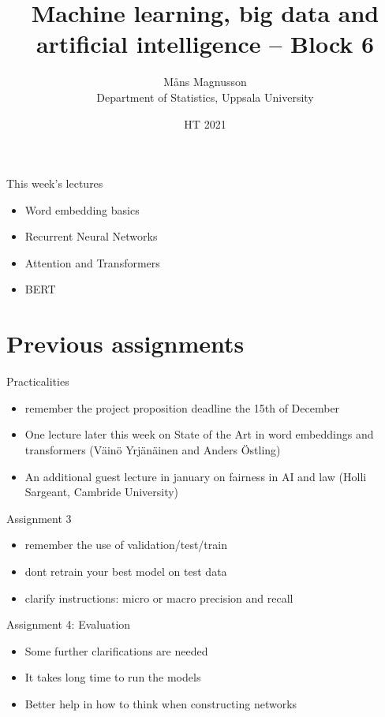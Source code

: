 \documentclass[10pt]{beamer}
\title[]{{\color{black}Machine learning, big data and artificial intelligence -- Block 6}}
\author[]{M{\aa}ns Magnusson\\Department of Statistics, Uppsala University}
\date{HT 2021}
\begin{document}
\frame{\titlepage
}



\begin{frame}{This week's lectures}
\begin{itemize}
\item Word embedding basics
\item Recurrent Neural Networks
\item Attention and Transformers
\item BERT
\end{itemize}
\end{frame}




\section{Previous assignments}

\begin{frame}{Practicalities}

\begin{itemize}
\item remember the project proposition deadline the 15th of December
\item One lecture later this week on State of the Art in word embeddings and transformers (Väinö Yrjänäinen and Anders Östling)
\item An additional guest lecture in january on fairness in AI and law (Holli Sargeant, Cambride University)
\end{itemize}

\end{frame}

\begin{frame}{Assignment 3}

\begin{itemize}
\item remember the use of validation/test/train
\item dont retrain your best model on test data
\item clarify instructions: micro or macro precision and recall
\end{itemize}

\end{frame}

\begin{frame}{Assignment 4: Evaluation}

\begin{itemize}
\item Some further clarifications are needed
\item It takes long time to run the models
\item Better help in how to think when constructing networks
\end{itemize}

\end{frame}
\end{document}
